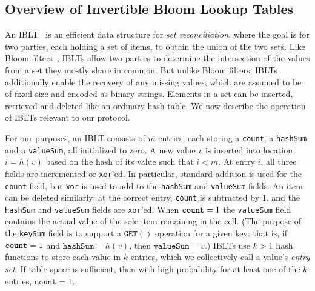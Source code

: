 \subsection{Overview of Invertible Bloom Lookup Tables}
An IBLT~\cite{goodrich:2011} is an efficient data structure for {\em set reconciliation}, where the goal is for two parties, each holding a set of items, to obtain the union of the two sets. Like 
  Bloom filters~\cite{Bloom:1970}, IBLTs allow
  two parties to determine the intersection of the values from a
  set they mostly share in common. But unlike Bloom filters, IBLTs additionally enable the
  recovery of any missing values, which are assumed to be of fixed
  size and encoded as binary strings.  Elements in a set can be
  inserted, retrieved and deleted like an ordinary hash table. We now describe the operation of IBLTs relevant to our protocol.
  
For our purposes, an IBLT consists of $m$ entries, each storing a \texttt{count}, a \texttt{hashSum} and a \texttt{valueSum}, all initialized to zero. A new value $v$ is inserted into location $i=h(v)$ based on
the hash of its value such that $i < m$.  At entry $i$, all three
fields are incremented or \texttt{xor}'ed. In particular, standard
addition is used for the \texttt{count} field, but \texttt{xor} is
used to add to the \texttt{hashSum} and \texttt{valueSum} fields. An
item can be deleted similarly: at the correct entry, \texttt{count}
is subtracted by 1, and the \texttt{hashSum} and \texttt{valueSum}
fields are \texttt{xor}'ed.  When $\mbox{\texttt{count}} = 1$
the \texttt{valueSum} field contains the actual value of the sole
item remaining in the cell.  (The purpose of the \texttt{keySum}
field is to support a $\texttt{GET}()$ operation for a given
key: that is, if $\mbox{\texttt{count}} = 1$ and
$\texttt{hashSum} = h(v)$, then
$\texttt{valueSum} = v$.)
IBLTs use $k > 1$ hash functions to store each value in $k$ entries, which we collectively call a value's \emph{entry set}.  
If table space is sufficient, then with high probability for at least one of the $k$
entries, $\texttt{count} = 1$.

